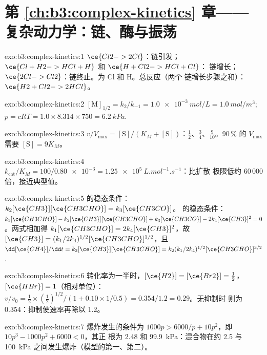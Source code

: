 \section*{第 \ref{ch:b3:complex-kinetics} 章——复杂动力学：链、酶与振荡}

\begin{solution}{exo:b3:complex-kinetics:1}
$\ce{Cl2 -> 2 Cl}$：链引发；$\ce{Cl + H2 -> HCl + H}$ 和 $\ce{H + Cl2 -> HCl + Cl}$：
链增长；$\ce{2 Cl -> Cl2}$：链终止。为 Cl 和 H。总反应（两个
链增长步骤之和）：$\ce{H2 + Cl2 -> 2 HCl}$。
\end{solution}

\begin{solution}{exo:b3:complex-kinetics:2}
$[\mathrm M]_{1/2} = k_2/k_{-1} = \qty{1.0e-3}{mol/L} = \qty{1.0}{mol/m^3}$; $p = cRT = 1.0 \times 8.314 \times 750 =
\qty{6.2}{kPa}$.
\end{solution}

\begin{solution}{exo:b3:complex-kinetics:3}
$v/V_{\max} = [\mathrm S]/(K_M + [\mathrm S])$：$\frac12$、$\frac34$、$\frac{9}{10}$。90\,\% 的 $V_{\max}$ 需要 $[\mathrm S] = 9K_M$。
\end{solution}

\begin{solution}{exo:b3:complex-kinetics:4}
$k_{\mathrm{cat}}/K_M = 100/\num{0.80e-3} = \qty{1.25e5}{L.mol^{-1}.s^{-1}}$：比扩散
极限低约 60\,000 倍，接近典型值。
\end{solution}

\begin{solution}{exo:b3:complex-kinetics:5}
 的稳态条件：$k_2[\ce{CH3}][\ce{CH3CHO}] = k_3[\ce{CH3CO}]$。 的稳态条件：
$k_1[\ce{CH3CHO}] - k_2[\ce{CH3}][\ce{CH3CHO}] + k_3[\ce{CH3CO}] - 2k_4[\ce{CH3}]^2 = 0$。两式相加得 $k_1[\ce{CH3CHO}] =
2k_4[\ce{CH3}]^2$，故 $[\ce{CH3}] = (k_1/2k_4)^{1/2}[\ce{CH3CHO}]^{1/2}$，且 $\dd[\ce{CH4}]/\dd t = k_2[\ce{CH3}][\ce{CH3CHO}] =
k_2(k_1/2k_4)^{1/2}[\ce{CH3CHO}]^{3/2}$.
\end{solution}

\begin{solution}{exo:b3:complex-kinetics:6}
转化率为一半时，$[\ce{H2}] = [\ce{Br2}] = \frac12$，$[\ce{HBr}] = 1$（相对单位）：
$v/v_0 = \frac12 \times (\frac12)^{1/2}/(1 + 0.10 \times 1/0.5) = 0.354/1.2 = 0.29$。无抑制时
则为 0.354：抑制使速率再除以 1.2。
\end{solution}

\begin{solution}{exo:b3:complex-kinetics:7}
爆炸发生的条件为 $1000p > 6000/p + 10p^2$，即 $10p^3 - 1000p^2 + 6000 < 0$，其正
根为 2.48 和 \qty{99.9}{kPa}：混合物在约 2.5 与
\qty{100}{kPa} 之间发生爆炸（模型的第一、第二）。
\end{solution}

